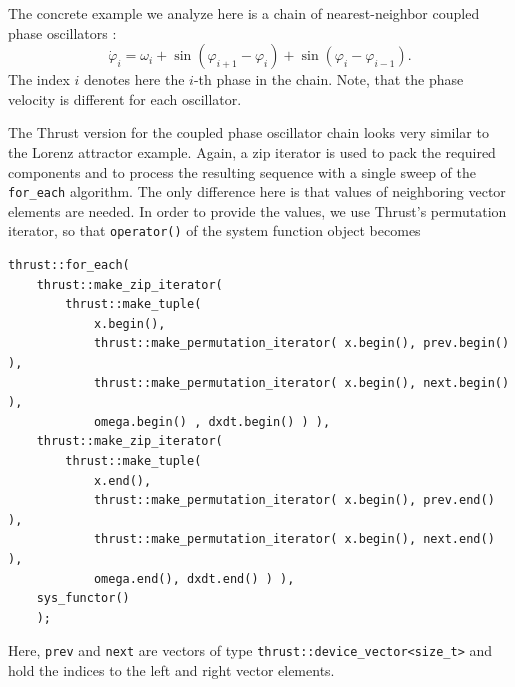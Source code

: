 \documentclass[final]{siamltex}
\newcommand{\code}[1]{\lstinline$#1$}
\begin{document}
The concrete example we analyze here is a chain of nearest-neighbor
coupled phase oscillators \cite{Cohen-Rand-Holmes-82}:
\begin{equation} \label{eq:phasesystem}
    \dot{\varphi}_i = \omega_i + \sin( \varphi_{i+1} - \varphi_i) + \sin( \varphi_i
    - \varphi_{i-1}).
\end{equation}
The index $i$ denotes here the $i$-th phase in the chain. Note, that
the phase velocity is different for each oscillator.

The Thrust version for the coupled phase oscillator chain looks very similar to
the Lorenz attractor example. Again, a zip iterator is used to pack the required
components and to process the resulting sequence with a single sweep of the
\code{for_each} algorithm. The only difference here is that values of
neighboring vector elements are needed. In order to provide the values, we use Thrust's
permutation iterator, so that \code{operator()} of the system function object becomes
\begin{lstlisting}
thrust::for_each(
    thrust::make_zip_iterator(
        thrust::make_tuple(
            x.begin(),
            thrust::make_permutation_iterator( x.begin(), prev.begin() ),
            thrust::make_permutation_iterator( x.begin(), next.begin() ),
            omega.begin() , dxdt.begin() ) ),
    thrust::make_zip_iterator(
        thrust::make_tuple(
            x.end(),
            thrust::make_permutation_iterator( x.begin(), prev.end() ),
            thrust::make_permutation_iterator( x.begin(), next.end() ),
            omega.end(), dxdt.end() ) ),
    sys_functor()
    );
\end{lstlisting}
Here, \code{prev} and \code{next} are vectors of type
\code{thrust::device_vector<size_t>} and hold the indices to the left and right
vector elements.
\end{document}
